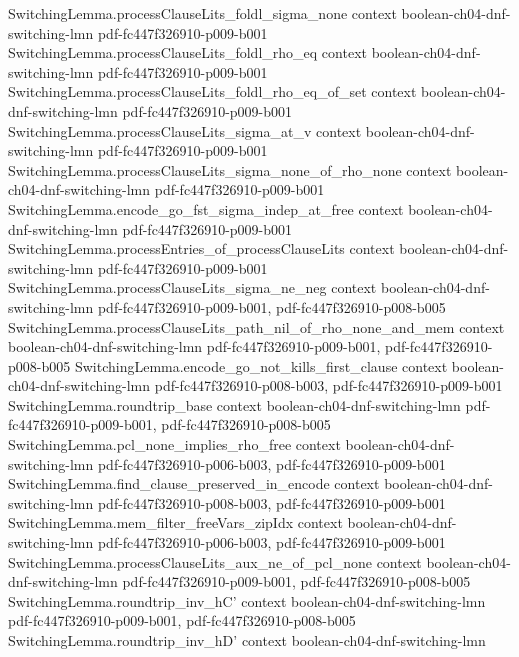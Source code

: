 \begin{theorem}
\proofstep
  {SwitchingLemma.processClauseLits_foldl_sigma_none}
  {context}
  {boolean-ch04-dnf-switching-lmn}
  {pdf-fc447f326910-p009-b001}
\proofstep
  {SwitchingLemma.processClauseLits_foldl_rho_eq}
  {context}
  {boolean-ch04-dnf-switching-lmn}
  {pdf-fc447f326910-p009-b001}
\proofstep
  {SwitchingLemma.processClauseLits_foldl_rho_eq_of_set}
  {context}
  {boolean-ch04-dnf-switching-lmn}
  {pdf-fc447f326910-p009-b001}
\proofstep
  {SwitchingLemma.processClauseLits_sigma_at_v}
  {context}
  {boolean-ch04-dnf-switching-lmn}
  {pdf-fc447f326910-p009-b001}
\proofstep
  {SwitchingLemma.processClauseLits_sigma_none_of_rho_none}
  {context}
  {boolean-ch04-dnf-switching-lmn}
  {pdf-fc447f326910-p009-b001}
\proofstep
  {SwitchingLemma.encode_go_fst_sigma_indep_at_free}
  {context}
  {boolean-ch04-dnf-switching-lmn}
  {pdf-fc447f326910-p009-b001}
\proofstep
  {SwitchingLemma.processEntries_of_processClauseLits}
  {context}
  {boolean-ch04-dnf-switching-lmn}
  {pdf-fc447f326910-p009-b001}
\proofstep
  {SwitchingLemma.processClauseLits_sigma_ne_neg}
  {context}
  {boolean-ch04-dnf-switching-lmn}
  {pdf-fc447f326910-p009-b001,
    pdf-fc447f326910-p008-b005}
\proofstep
  {SwitchingLemma.processClauseLits_path_nil_of_rho_none_and_mem}
  {context}
  {boolean-ch04-dnf-switching-lmn}
  {pdf-fc447f326910-p009-b001,
    pdf-fc447f326910-p008-b005}
\proofstep
  {SwitchingLemma.encode_go_not_kills_first_clause}
  {context}
  {boolean-ch04-dnf-switching-lmn}
  {pdf-fc447f326910-p008-b003,
    pdf-fc447f326910-p009-b001}
\proofstep
  {SwitchingLemma.roundtrip_base}
  {context}
  {boolean-ch04-dnf-switching-lmn}
  {pdf-fc447f326910-p009-b001,
    pdf-fc447f326910-p008-b005}
\proofstep
  {SwitchingLemma.pcl_none_implies_rho_free}
  {context}
  {boolean-ch04-dnf-switching-lmn}
  {pdf-fc447f326910-p006-b003,
    pdf-fc447f326910-p009-b001}
\proofstep
  {SwitchingLemma.find_clause_preserved_in_encode}
  {context}
  {boolean-ch04-dnf-switching-lmn}
  {pdf-fc447f326910-p008-b003,
    pdf-fc447f326910-p009-b001}
\proofstep
  {SwitchingLemma.mem_filter_freeVars_zipIdx}
  {context}
  {boolean-ch04-dnf-switching-lmn}
  {pdf-fc447f326910-p006-b003,
    pdf-fc447f326910-p009-b001}
\proofstep
  {SwitchingLemma.processClauseLits_aux_ne_of_pcl_none}
  {context}
  {boolean-ch04-dnf-switching-lmn}
  {pdf-fc447f326910-p009-b001,
    pdf-fc447f326910-p008-b005}
\proofstep
  {SwitchingLemma.roundtrip_inv_hC'}
  {context}
  {boolean-ch04-dnf-switching-lmn}
  {pdf-fc447f326910-p009-b001,
    pdf-fc447f326910-p008-b005}
\proofstep
  {SwitchingLemma.roundtrip_inv_hD'}
  {context}
  {boolean-ch04-dnf-switching-lmn}

\end{theorem}
